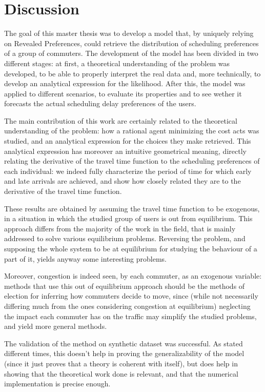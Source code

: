 \chapter{Discussion}
\label{chap:discussion}

The goal of this master thesis was to develop a model that,
by uniquely relying on Revealed Preferences,
could retrieve the distribution of scheduling preferences of a group of commuters.
The development of the model has been divided in two different stages:
at first, a theoretical understanding of the problem was developed,
to be able to properly interpret the real data and,
more technically, to develop an analytical expression for the likelihood.
After this, the model was applied to different scenarios,
to evaluate its properties and to see wether it forecasts the actual scheduling delay preferences of the users.

The main contribution of this work are certainly related to the theoretical understanding of the problem:
how a rational agent minimizing the cost acts was studied,
and an analytical expression for the choices they make retrieved.
This analytical expression has moreover an intuitive geometrical meaning,
directly relating the derivative of the travel time function to the scheduling preferences of each individual:
we indeed fully characterize the period of time for which early and late arrivals are achieved,
and show how closely related they are to the derivative of the travel time function.

These results are obtained by assuming the travel time function to be exogenous,
in a situation in which the studied group of users is out from equilibrium.
This approach differs from the majority of the work in the field,
that is mainly addressed to solve various equilibrium problems.
Reversing the problem, and supposing the whole system to be at equilibrium for studying the behaviour of a part of it,
yields anyway some interesting problems.

Moreover, congestion is indeed seen, by each commuter,
as an exogenous variable:
methods that use this out of equilibrium approach should be the methods of election for inferring how commuters decide to move,
since
(while not necessarily differing much from the ones considering congestion at equilibrium)
neglecting the impact each commuter has on the traffic may simplify the studied problems,
and yield more general methods.

The validation of the method on synthetic dataset was successful.
As stated different times,
this doesn't help in proving the generalizability of the model (since it just proves that a theory is coherent with itself),
but does help in showing that the theoretical work done is relevant,
and that the numerical implementation is precise enough.

